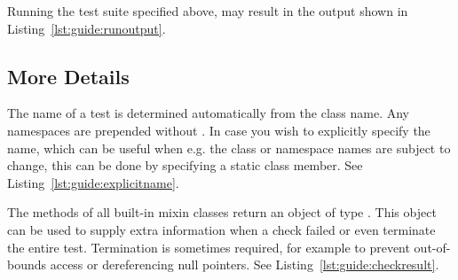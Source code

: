 Running the test suite specified above, may result in the output shown in Listing~\ref{lst:guide:runoutput}.



\subsection{More Details}

The name of a test is determined automatically from the class name. Any namespaces are prepended without \code{::}. In case you wish to explicitly specify the name, which can be useful when e.g. the class or namespace names are subject to change, this can be done by specifying a static class member. See Listing~\ref{lst:guide:explicitname}.



The methods of all built-in mixin classes return an object of type . This object can be used to supply extra information when a check failed or even terminate the entire test. Termination is sometimes required, for example to prevent out-of-bounds access or dereferencing null pointers. See Listing~\ref{lst:guide:checkresult}.

